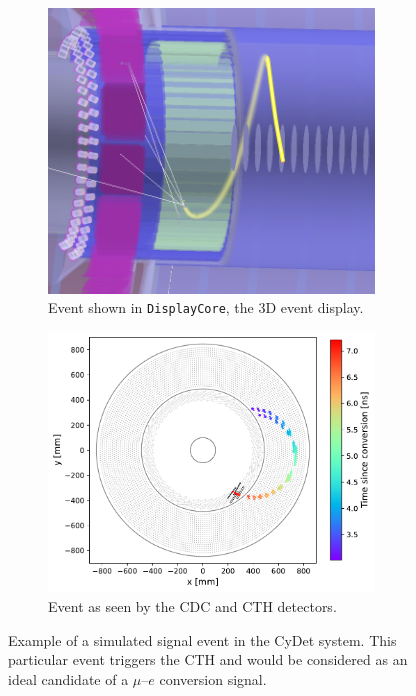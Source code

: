 \begin{figure}
    \centering
    \captionsetup[subfigure]{justification=centering}
    \begin{subfigure}[b]{0.41\textwidth}
    \centering
    \includegraphics[width=0.95\textwidth]{chapter3/signal_event_display_crop.png}
    \caption{Event shown in \texttt{DisplayCore}, the 3D event display.}
    \end{subfigure}
    \hfill
    \begin{subfigure}[b]{0.58\textwidth}
    \centering
    \includegraphics[width=0.95\textwidth]{chapter3/cydet_signal_track_v2.pdf}
    \caption{Event as seen by the CDC and CTH detectors.}
    \end{subfigure}
    
    \caption{Example of a simulated signal event in the CyDet system. This particular event triggers the CTH and would be considered as an ideal candidate of a $\mu$--$e$ conversion signal.}
    \label{fig:signal_event}
\end{figure}

